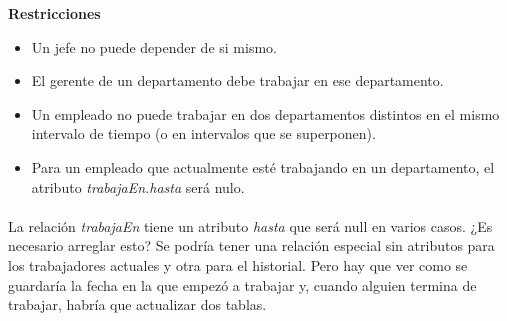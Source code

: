 \begin{multicols}{2}
	\textbf{Restricciones}
	
	\begin{itemize}
		\item Un jefe no puede depender de si mismo.
		\item El gerente de un departamento debe trabajar en ese departamento.
		\item Un empleado no puede trabajar en dos departamentos distintos en el mismo intervalo de tiempo (o en intervalos que se superponen).
		\item Para un empleado que actualmente esté trabajando en un departamento, el atributo \textit{trabajaEn.hasta} será nulo.
	\end{itemize}
	
	\paragraph{} La relación \textit{trabajaEn} tiene un atributo \textit{hasta} que será null en varios casos. ¿Es necesario arreglar esto? Se podría tener una relación especial sin atributos para los trabajadores actuales y otra para el historial. Pero hay que ver como se guardaría la fecha en la que empezó a trabajar y, cuando alguien termina de trabajar, habría que actualizar dos tablas.
\end{multicols}

